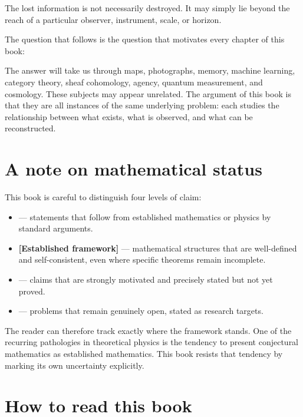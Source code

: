The lost information is not necessarily destroyed.
It may simply lie beyond the reach of a particular observer,
instrument, scale, or horizon.

The question that follows is the question that motivates every
chapter of this book:


The answer will take us through maps, photographs, memory, machine
learning, category theory, sheaf cohomology, agency, quantum
measurement, and cosmology.
These subjects may appear unrelated.
The argument of this book is that they are all instances of the same
underlying problem: each studies the relationship between what
exists, what is observed, and what can be reconstructed.

\section*{A note on mathematical status}

This book is careful to distinguish four levels of claim:

\begin{itemize}[leftmargin=2em]
  \item \statusproven{} --- statements that follow from established
    mathematics or physics by standard arguments.
  \item \textbf{[Established framework]} --- mathematical structures
    that are well-defined and self-consistent, even where specific
    theorems remain incomplete.
  \item \statusconjectured{} --- claims that are strongly motivated
    and precisely stated but not yet proved.
  \item \statusopen{} --- problems that remain genuinely open,
    stated as research targets.
\end{itemize}

The reader can therefore track exactly where the framework stands.
One of the recurring pathologies in theoretical physics is the
tendency to present conjectural mathematics as established
mathematics.
This book resists that tendency by marking its own uncertainty
explicitly.

\section*{How to read this book}

